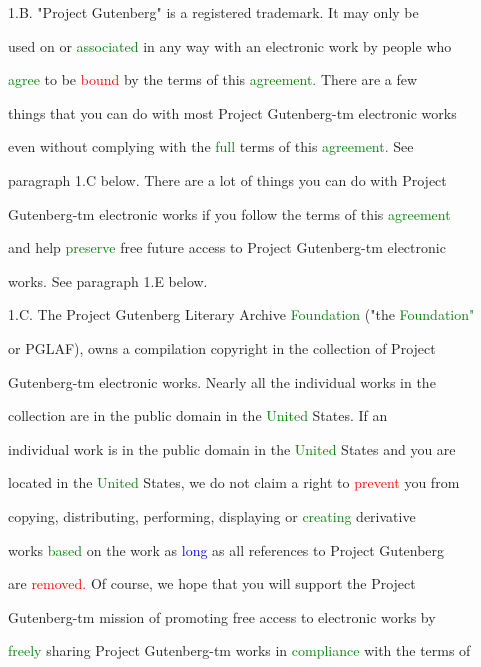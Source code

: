  1.B. "Project Gutenberg" is a registered trademark. It may only be

 used on or \textcolor{green}{associated} in any way with an electronic work by people who

 \textcolor{green}{agree} to be \textcolor{red}{bound} by the terms of this \textcolor{green}{agreement.} There are a few

 things that you can do with most Project Gutenberg-tm electronic works

 even without complying with the \textcolor{green}{full} terms of this \textcolor{green}{agreement.} See

 paragraph 1.C below. There are a lot of things you can do with Project

 Gutenberg-tm electronic works if you follow the terms of this \textcolor{green}{agreement}

 and help \textcolor{green}{preserve} free future access to Project Gutenberg-tm electronic

 works. See paragraph 1.E below.



 1.C. The Project Gutenberg Literary Archive \textcolor{green}{Foundation} ("the \textcolor{green}{Foundation"}

 or PGLAF), owns a compilation copyright in the collection of Project

 Gutenberg-tm electronic works. Nearly all the individual works in the

 collection are in the \textcolor{BurntOrange}{public} domain in the \textcolor{green}{United} States. If an

 individual work is in the \textcolor{BurntOrange}{public} domain in the \textcolor{green}{United} States and you are

 located in the \textcolor{green}{United} States, we do not claim a right to \textcolor{red}{prevent} you from

 copying, distributing, performing, displaying or \textcolor{green}{creating} derivative

 works \textcolor{green}{based} on the work as \textcolor{blue}{long} as all references to Project Gutenberg

 are \textcolor{red}{removed.} Of course, we \textcolor{BurntOrange}{hope} that you will support the Project

 Gutenberg-tm mission of promoting free access to electronic works by

 \textcolor{green}{freely} \textcolor{BurntOrange}{sharing} Project Gutenberg-tm works in \textcolor{green}{compliance} with the terms of

